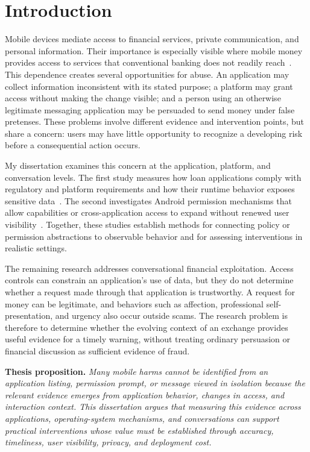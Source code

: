 \documentclass[letterpaper,11pt]{article}
\begin{document}
\section{Introduction}
\label{sec:intro}
Mobile devices mediate access to financial services, private communication, and
personal information. Their importance is especially visible where mobile money
provides access to services that conventional banking does not readily
reach~\cite{suri2016mpesa,findex2021}. This dependence creates several opportunities
for abuse. An application may collect information inconsistent with its stated
purpose; a platform may grant access without making the change visible; and a
person using an otherwise legitimate messaging application may be persuaded to
send money under false pretenses. These problems involve different evidence and
intervention points, but share a concern: users may have little opportunity to
recognize a developing risk before a consequential action occurs.

My dissertation examines this concern at the application, platform, and
conversation levels. The first study measures how loan applications comply with
regulatory and platform requirements and how their runtime behavior exposes
sensitive data~\cite{akanji2026cost}. The second investigates Android permission
mechanisms that allow capabilities or cross-application access to expand without
renewed user visibility~\cite{akanji2026silent}. Together, these studies establish
methods for connecting policy or permission abstractions to observable behavior
and for assessing interventions in realistic settings.

The remaining research addresses conversational financial exploitation. Access
controls can constrain an application's use of data, but they do not determine
whether a request made through that application is trustworthy. A request for
money can be legitimate, and behaviors such as affection, professional
self-presentation, and urgency also occur outside scams. The research problem is
therefore to determine whether the evolving context of an exchange provides
useful evidence for a timely warning, without treating ordinary persuasion or
financial discussion as sufficient evidence of fraud.

\textbf{Thesis proposition.} \emph{Many mobile harms cannot be identified from
an application listing, permission prompt, or message viewed in isolation because
the relevant evidence emerges from application behavior, changes in access, and
interaction context. This dissertation argues that measuring this evidence across
applications, operating-system mechanisms, and conversations can support practical
interventions whose value must be established through accuracy, timeliness, user
visibility, privacy, and deployment cost.}
\end{document}
